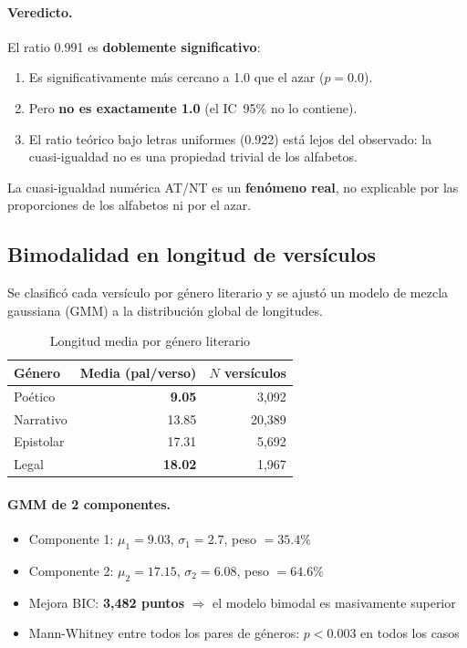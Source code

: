 \documentclass[12pt,a4paper]{article}
\newcommand{\val}[1]{\textcolor{hlcolor}{\textbf{#1}}}
\begin{document}
\paragraph{Veredicto.}
El ratio 0.991 es \textbf{doblemente significativo}:
\begin{enumerate}[leftmargin=2em]
\item Es significativamente m\'as cercano a 1.0 que el azar ($p = 0.0$).
\item Pero \textbf{no es exactamente 1.0} (el IC~95\% no lo contiene).
\item El ratio te\'orico bajo letras uniformes (0.922) est\'a lejos del observado:
      la cuasi-igualdad no es una propiedad trivial de los alfabetos.
\end{enumerate}

La cuasi-igualdad num\'erica AT/NT es un \textbf{fen\'omeno real}, no explicable
por las proporciones de los alfabetos ni por el azar.

\subsection{Bimodalidad en longitud de vers\'iculos}

Se clasific\'o cada vers\'iculo por g\'enero literario y se ajust\'o un modelo de
mezcla gaussiana (GMM) a la distribuci\'on global de longitudes.

\begin{table}[H]
\centering
\caption{Longitud media por g\'enero literario}
\label{tab:genres}
\begin{tabular}{lrr}
\toprule
\textbf{G\'enero} & \textbf{Media (pal/verso)} & \textbf{$N$ vers\'iculos} \\
\midrule
Po\'etico   & \val{9.05}  & 3,092 \\
Narrativo   & 13.85 & 20,389 \\
Epistolar   & 17.31 & 5,692 \\
Legal       & \val{18.02} & 1,967 \\
\bottomrule
\end{tabular}
\end{table}

\paragraph{GMM de 2 componentes.}
\begin{itemize}[leftmargin=2em]
\item Componente 1: $\mu_1 = 9.03$, $\sigma_1 = 2.7$, peso $= 35.4\%$
\item Componente 2: $\mu_2 = 17.15$, $\sigma_2 = 6.08$, peso $= 64.6\%$
\item Mejora BIC: \val{3,482 puntos} $\Rightarrow$ el modelo bimodal es masivamente superior
\item Mann-Whitney entre todos los pares de g\'eneros: $p < 0.003$ en todos los casos
\end{itemize}
\end{document}
